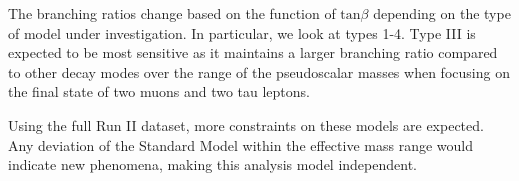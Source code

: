 The branching ratios change based on the function of $\text{tan}\beta$ depending on the type of model under investigation. In particular, we look at types 1-4. Type III is expected to be most sensitive as it maintains a larger branching ratio compared to other decay modes over the range of the pseudoscalar masses when focusing on the final state of two muons and two tau leptons.

Using the full Run II dataset, more constraints on these models are expected. Any deviation of the Standard Model within the effective mass range would indicate new phenomena, making this analysis model independent. 

